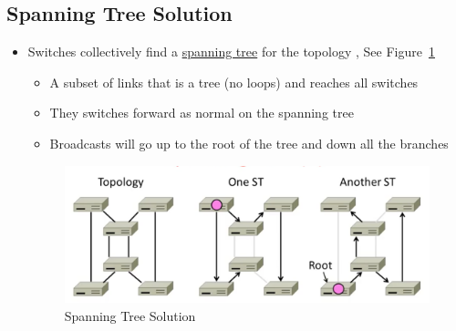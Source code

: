 \documentclass[12pt]{ctexart}   %
\begin{document}
	\subsection{ Spanning Tree Solution}
	\begin{itemize}
		\item Switches collectively find a \underline{spanning tree} for the topology  , See Figure~\ref{fig:3-8-4}
		\begin{itemize}
			\item A subset of links that is a tree (no loops) and reaches all switches
			\item They switches forward as normal on the spanning tree
			\item Broadcasts will go up to the root of the tree and down all the branches
		\end{itemize}
		
		\begin{figure}[h!] %
		\centering
		 \includegraphics[scale=0.7]{images/3-8-4}
		\caption{ Spanning Tree Solution }
		 \label{fig:3-8-4}
		 \end{figure}
	\end{itemize}
	
\end{document}
